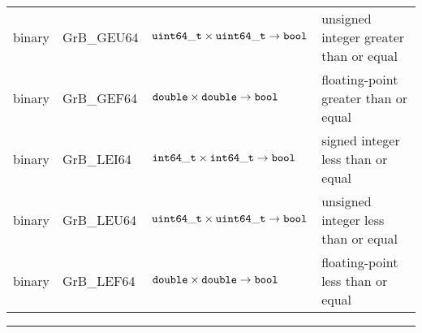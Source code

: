 \begin{table}
\begin{center}
\begin{tabular}{l|l|l|l}
binary		& {\sf GrB\_GEU64}	& ${\tt uint64\_t} \times {\tt uint64\_t} \rightarrow {\tt bool}$ 	& unsigned integer greater than or equal \\
binary		& {\sf GrB\_GEF64}	& ${\tt double} \times {\tt double} \rightarrow {\tt bool}$ 		& floating-point greater than or equal \\
binary		& {\sf GrB\_LEI64}	& ${\tt int64\_t} \times {\tt int64\_t} \rightarrow {\tt bool}$		& signed integer less than or equal \\
binary		& {\sf GrB\_LEU64}	& ${\tt uint64\_t} \times {\tt uint64\_t} \rightarrow {\tt bool}$ 	& unsigned integer less than or equal \\
binary		& {\sf GrB\_LEF64}	& ${\tt double} \times {\tt double} \rightarrow {\tt bool}$ 		& floating-point less than or equal \\
\end{tabular}
\end{center}
\hrule
\end{table}
